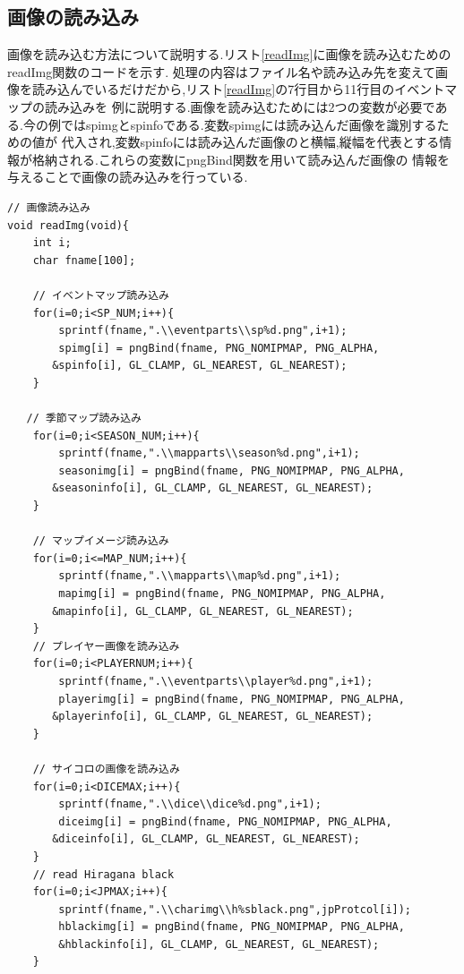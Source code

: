 \documentclass[a4j]{jarticle}
\begin{document}
  \subsection{画像の読み込み}
  画像を読み込む方法について説明する.リスト\ref{readImg}に画像を読み込むためのreadImg関数のコードを示す.
  処理の内容はファイル名や読み込み先を変えて画像を読み込んでいるだけだから,リスト\ref{readImg}の7行目から11行目のイベントマップの読み込みを
  例に説明する.画像を読み込むためには2つの変数が必要である.今の例ではspimgとspinfoである.変数spimgには読み込んだ画像を識別するための値が
  代入され,変数spinfoには読み込んだ画像のと横幅,縦幅を代表とする情報が格納される.これらの変数にpngBind関数を用いて読み込んだ画像の
  情報を与えることで画像の読み込みを行っている.
  \begin{lstlisting}[basicstyle=\ttfamily\footnotesize, frame=single,label=readImg,caption=readImg関数]
// 画像読み込み
void readImg(void){
    int i;
    char fname[100];

    // イベントマップ読み込み
    for(i=0;i<SP_NUM;i++){
        sprintf(fname,".\\eventparts\\sp%d.png",i+1);
        spimg[i] = pngBind(fname, PNG_NOMIPMAP, PNG_ALPHA, 
       &spinfo[i], GL_CLAMP, GL_NEAREST, GL_NEAREST);        
    }

   // 季節マップ読み込み 
    for(i=0;i<SEASON_NUM;i++){
        sprintf(fname,".\\mapparts\\season%d.png",i+1);
        seasonimg[i] = pngBind(fname, PNG_NOMIPMAP, PNG_ALPHA, 
       &seasoninfo[i], GL_CLAMP, GL_NEAREST, GL_NEAREST);        
    }

    // マップイメージ読み込み
    for(i=0;i<=MAP_NUM;i++){
        sprintf(fname,".\\mapparts\\map%d.png",i+1);
        mapimg[i] = pngBind(fname, PNG_NOMIPMAP, PNG_ALPHA, 
       &mapinfo[i], GL_CLAMP, GL_NEAREST, GL_NEAREST);
    }
    // プレイヤー画像を読み込み
    for(i=0;i<PLAYERNUM;i++){
        sprintf(fname,".\\eventparts\\player%d.png",i+1);
        playerimg[i] = pngBind(fname, PNG_NOMIPMAP, PNG_ALPHA, 
       &playerinfo[i], GL_CLAMP, GL_NEAREST, GL_NEAREST);
    }

    // サイコロの画像を読み込み
    for(i=0;i<DICEMAX;i++){
        sprintf(fname,".\\dice\\dice%d.png",i+1);
        diceimg[i] = pngBind(fname, PNG_NOMIPMAP, PNG_ALPHA, 
       &diceinfo[i], GL_CLAMP, GL_NEAREST, GL_NEAREST);
    }
    // read Hiragana black
    for(i=0;i<JPMAX;i++){
        sprintf(fname,".\\charimg\\h%sblack.png",jpProtcol[i]);
        hblackimg[i] = pngBind(fname, PNG_NOMIPMAP, PNG_ALPHA, 
        &hblackinfo[i], GL_CLAMP, GL_NEAREST, GL_NEAREST);
    }


\end{lstlisting}
\end{document}
